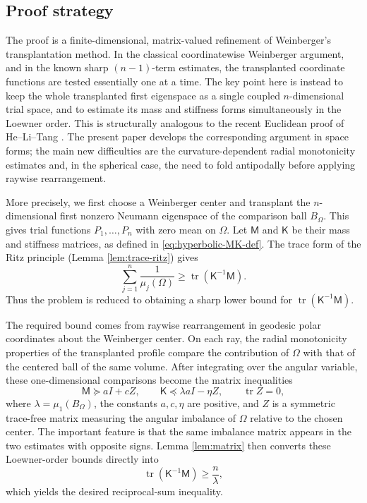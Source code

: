 \documentclass[10pt,a4paper]{amsart}
\DeclareMathOperator{\tr}{tr}
\newcommand{\Id}{I}
\newcommand{\mcM}{\mathsf M}
\newcommand{\mcK}{\mathsf K}
\begin{document}
\subsection{Proof strategy}
The proof is a finite-dimensional, matrix-valued refinement of
Weinberger's transplantation method.  In the classical coordinatewise
Weinberger argument, and in the known sharp $(n-1)$-term estimates, the
transplanted coordinate functions are tested essentially one at a time.  The
key point here is instead to keep the whole transplanted first eigenspace as
a single coupled $n$-dimensional trial space, and to estimate its mass and
stiffness forms simultaneously in the Loewner order.  This is structurally
analogous to the recent Euclidean proof of He--Li--Tang \cite{HeLiTang}.  The
present paper develops the corresponding argument in space forms; the main
new difficulties are the curvature-dependent radial monotonicity estimates
and, in the spherical case, the need to fold antipodally before applying
raywise rearrangement.

More precisely, we first choose a Weinberger center and transplant the
$n$-dimensional first nonzero Neumann eigenspace of the comparison ball
$B_\Omega$.  This gives trial functions $P_1,\dots,P_n$ with zero mean on
$\Omega$.  Let $\mcM$ and $\mcK$ be their mass and stiffness matrices, as
defined in \eqref{eq:hyperbolic-MK-def}.  The trace form of the Ritz principle
(Lemma \ref{lem:trace-ritz}) gives
$$
        \sum_{j=1}^n\frac1{\mu_j(\Omega)}
        \ge \tr(\mcK^{-1}\mcM).
$$
Thus the problem is reduced to obtaining a sharp lower bound for
$\tr(\mcK^{-1}\mcM)$.

The required bound comes from raywise rearrangement in geodesic polar
coordinates about the Weinberger center.  On each ray, the radial
monotonicity properties of the transplanted profile compare the contribution
of $\Omega$ with that of the centered ball of the same volume.  After
integrating over the angular variable, these one-dimensional comparisons
become the matrix inequalities
$$
        \mcM\succeq a\Id+cZ,
        \qquad
        \mcK\preceq \lambda a\Id-\eta Z,
        \qquad
        \tr Z=0,
$$
where $\lambda=\mu_1(B_\Omega)$, the constants $a,c,\eta$ are positive, and
$Z$ is a symmetric trace-free matrix measuring the angular imbalance of
$\Omega$ relative to the chosen center.  The important feature is that the
same imbalance matrix appears in the two estimates with opposite signs.
Lemma \ref{lem:matrix} then converts these Loewner-order bounds directly into
$$
        \tr(\mcK^{-1}\mcM)\ge \frac{n}{\lambda},
$$
which yields the desired reciprocal-sum inequality.
\end{document}

